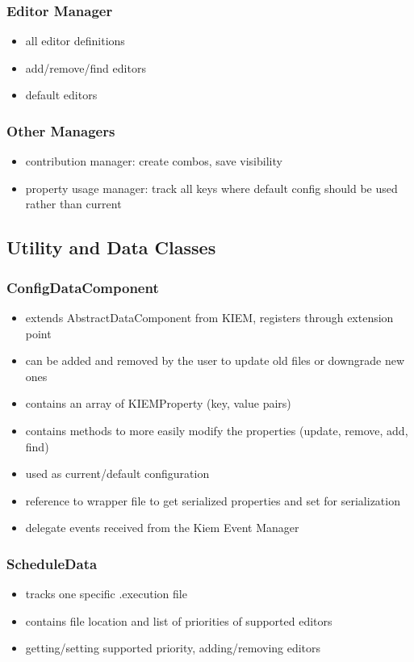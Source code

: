 \subsubsection{Editor Manager}
\begin{itemize}
 \item all editor definitions
 \item add/remove/find editors
 \item default editors 
\end{itemize}

\subsubsection{Other Managers}
\begin{itemize}
 \item contribution manager: create combos, save visibility
 \item property usage manager: track all keys where default config should be used rather than current
\end{itemize}

\subsection{Utility and Data Classes}

\subsubsection{ConfigDataComponent}
\begin{itemize}
 \item extends AbstractDataComponent from KIEM, registers through extension point
 \item can be added and removed by the user to update old files or downgrade new ones
 \item contains an array of KIEMProperty (key, value pairs)
 \item contains methods to more easily modify the properties (update, remove, add, find)
 \item used as current/default configuration
 \item reference to wrapper file to get serialized properties and set for serialization
 \item delegate events received from the Kiem Event Manager
\end{itemize}

\subsubsection{ScheduleData}
\begin{itemize}
 \item tracks one specific .execution file
 \item contains file location and list of priorities of supported editors
 \item getting/setting supported priority, adding/removing editors
\end{itemize}

